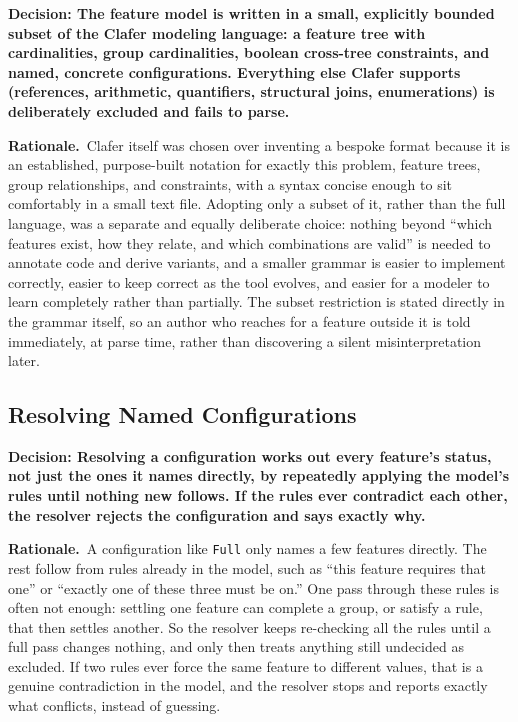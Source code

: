 \documentclass[11pt]{article}
\newcommand{\decision}[1]{\medskip\noindent\textbf{Decision: #1}\par\nopagebreak\smallskip}
\newcommand{\rationale}{\noindent\textbf{Rationale.}\ }
\begin{document}
\decision{The feature model is written in a small, explicitly bounded
subset of the Clafer modeling language: a feature tree with
cardinalities, group cardinalities, boolean cross-tree constraints, and
named, concrete configurations. Everything else Clafer supports
(references, arithmetic, quantifiers, structural joins, enumerations) is
deliberately excluded and fails to parse.}

\rationale Clafer itself was chosen over inventing a bespoke format
because it is an established, purpose-built notation for exactly this
problem, feature trees, group relationships, and constraints, with a
syntax concise enough to sit comfortably in a small text file. Adopting
only a subset of it, rather than the full language, was a separate and
equally deliberate choice: nothing beyond ``which features exist, how they
relate, and which combinations are valid'' is needed to annotate code and
derive variants, and a smaller grammar is easier to implement correctly,
easier to keep correct as the tool evolves, and easier for a modeler to
learn completely rather than partially. The subset restriction is stated
directly in the grammar itself, so an author who reaches for a feature
outside it is told immediately, at parse time, rather than discovering
a silent misinterpretation later.

\subsection{Resolving Named Configurations}

\decision{Resolving a configuration works out every feature's status, not
just the ones it names directly, by repeatedly applying the model's
rules until nothing new follows. If the rules ever contradict each
other, the resolver rejects the configuration and says exactly why.}

\rationale A configuration like \texttt{Full} only names a few features
directly. The rest follow from rules already in the model, such as
``this feature requires that one'' or ``exactly one of these three must
be on.'' One pass through these rules is often not enough: settling one
feature can complete a group, or satisfy a rule, that then settles
another. So the resolver keeps re-checking all the rules until a full
pass changes nothing, and only then treats anything still undecided as
excluded. If two rules ever force the same feature to different values,
that is a genuine contradiction in the model, and the resolver stops and
reports exactly what conflicts, instead of guessing.
\end{document}
